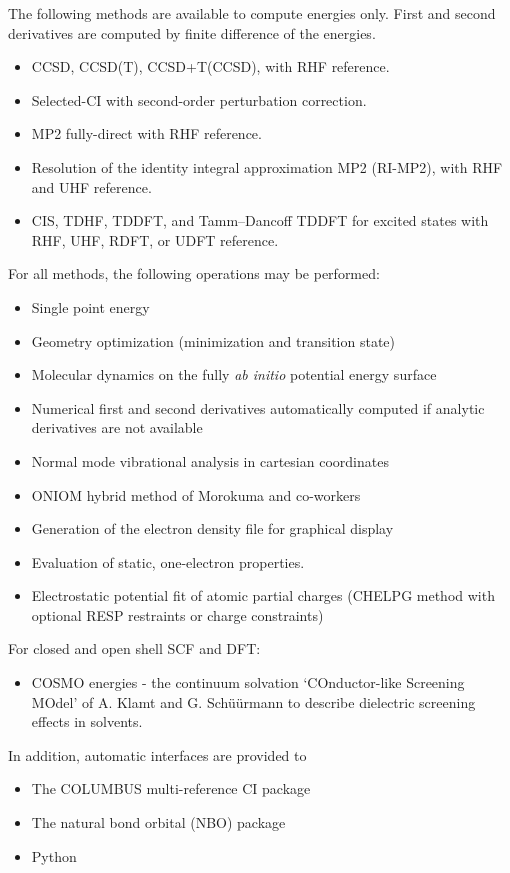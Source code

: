 The following methods are available to compute energies only.  First
and second derivatives are computed by finite difference of the
energies.
\begin{itemize}
\item CCSD, CCSD(T), CCSD+T(CCSD), with RHF reference.
\item Selected-CI with second-order perturbation correction.
\item MP2 fully-direct with RHF reference.
\item Resolution of the identity integral approximation MP2 (RI-MP2), with
  RHF and UHF reference.
\item CIS, TDHF, TDDFT, and Tamm--Dancoff TDDFT for excited states with RHF, UHF, RDFT, or UDFT reference.
\end{itemize}

For all methods, the following operations may be performed:
\begin{itemize}
\item Single point energy
\item Geometry optimization (minimization and transition state)
\item Molecular dynamics on the fully {\em ab initio} potential energy
  surface
\item Numerical first and second derivatives automatically computed if
  analytic derivatives are not available
\item Normal mode vibrational analysis in cartesian coordinates
\item ONIOM hybrid method of Morokuma and co-workers
\item Generation of the electron density file for graphical display
\item Evaluation of static, one-electron properties.
\item Electrostatic potential fit of atomic partial charges (CHELPG method with
    optional RESP restraints or charge constraints)
\end{itemize}

For closed and open shell SCF and DFT:
\begin{itemize}
\item COSMO energies - the continuum solvation `COnductor-like Screening MOdel'
    of A. Klamt and G. Sch\"{u}\"{u}rmann to describe dielectric screening effects in
    solvents.
\end{itemize}

In addition, automatic interfaces are provided to
\begin{itemize}
\item The COLUMBUS multi-reference CI package
\item The natural bond orbital (NBO) package
\item Python
\end{itemize}

